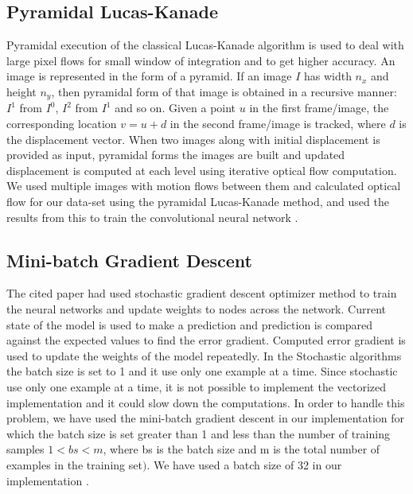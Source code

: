 \documentclass[]{article}
\begin{document}
\subsection{Pyramidal Lucas-Kanade}\label{subsec:pyramidal-lucas-kanade}
Pyramidal execution of the classical Lucas-Kanade algorithm is used to deal with large pixel flows for small window of integration and to get higher accuracy.
An image is represented in the form of a pyramid. If an image $I$ has width $n_x$ and height $n_y$, then pyramidal form of that image is obtained in a recursive manner: $I^1$ from $I^0$, $I^2$ from $I^1$ and so on.
Given a point $u$ in the first frame/image, the corresponding location $v=u+d$ in the second frame/image is tracked, where $d$ is the displacement vector.
When two images along with initial displacement is provided as input, pyramidal forms the images are built and updated displacement is computed at each level using iterative optical flow computation.
We used multiple images with motion flows between them and calculated optical flow for our data-set using the pyramidal Lucas-Kanade method, and used the results from this to train the convolutional neural network \cite{bouguet}.

\subsection{Mini-batch Gradient Descent}\label{subsec:mini-batch-gradient-descent}
The cited paper had used stochastic gradient descent optimizer method to train the neural networks and update weights to nodes across the network.
Current state of the model is used to make a prediction and prediction is compared against the expected values to find the error gradient.
Computed error gradient is used to update the weights of the model repeatedly.
In the Stochastic algorithms the batch size is set to 1 and it use only one example at a time.
Since stochastic use only one example at a time, it is not possible to implement the vectorized implementation and it could slow down the computations.
In order to handle this problem, we have used the mini-batch gradient descent in our implementation for which the batch size is set greater than 1 and less than the number of training samples $1 < bs < m$, where bs is the batch size and m is the total number of examples in the training set$)$.
We have used a batch size of 32 in our implementation \cite{brownlee}.
\end{document}
